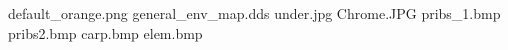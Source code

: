default_orange.png
general_env_map.dds
under.jpg
Chrome.JPG
pribs_1.bmp
pribs2.bmp
carp.bmp
elem.bmp
